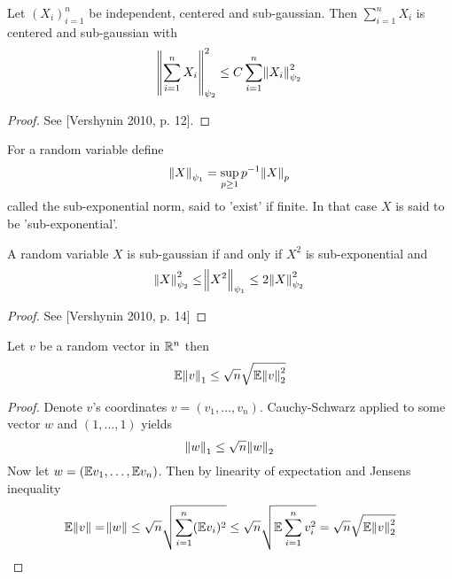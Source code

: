 

\begin{lem}
  Let $(X_i)_{i=1}^n$ be independent, centered and sub-gaussian. Then
  $\sum_{i=1}^n X_i$ is centered and sub-gaussian with
  \begin{equation*} %
    \norm{\sum_{i=1}^n X_i}^2_{\psi_2} \leq C \sum_{i=1}^n \norm{X_i}_{\psi_2}^2
  \end{equation*}
  \label{lem:vershynin5_9}
\end{lem}
\begin{proof}
  See [Vershynin 2010, p. 12]. %
\end{proof}

\begin{defn}
  For a random variable define
  \begin{equation*}
    \norm{X}_{\psi_1} = \sup_{p\geq 1} p^{-1} \norm{X}_p
  \end{equation*}
  called the sub-exponential norm, said to 'exist' if finite.
  In that case $X$ is said to be 'sub-exponential'.
\end{defn}

\begin{lem}
  A random variable $X$ is sub-gaussian if and only if $X^2$ is sub-exponential
  and
  \begin{equation*}
    \norm{X}^2_{\psi_2} \leq \norm{X^2}_{\psi_1} \leq 2 \norm{X}_{\psi_2}^2
  \end{equation*}
  \label{lem:vershynin5_14}
\end{lem}
\begin{proof}
  See [Vershynin 2010, p. 14]
\end{proof}

\begin{prop}
  \label{lem:norm12ineq}
  Let $v$ be a random vector in $\mathbb{R}^n$ then
  \[ \mathbb{E} \norm{v}_1 \leq \sqrt{n} \sqrt{ \mathbb{E} \norm{v}_2^2 } \]
\end{prop}

\begin{proof}
  Denote $v$'s coordinates $v=(v_1, \dots, v_n)$.
  Cauchy-Schwarz applied to some vector $w$ and $(1, \dots, 1)$ yields
  \[ \norm{w}_1 \leq \sqrt{n} \norm{w}_2 \]
  Now let $w = (\mathbb{E} v_1, \dots, \mathbb{E} v_n)$.
  Then by linearity of expectation and Jensens inequality
  \[ \mathbb{E} \norm{v} = \norm{w} \leq \sqrt{n} \sqrt{\sum_{i=1}^n (\mathbb{E} v_i)^2}
  \leq \sqrt{n} \sqrt{\mathbb{E} \sum_{i=1}^n v_i^2} = \sqrt{n} \sqrt{\mathbb{E} \norm{v}_2^2} \]
\end{proof}

